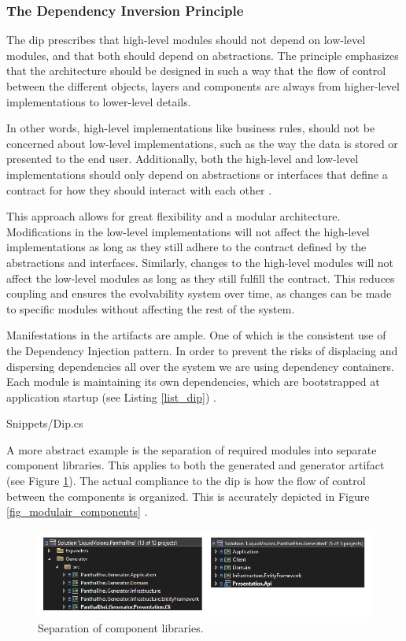 \subsubsection{The Dependency Inversion Principle} \label{subsubsec_dip} 

The \gls{dip} prescribes that high-level modules should not depend on low-level modules,
and that both should depend on abstractions. The principle emphasizes that the
architecture should be designed in such a way that the flow of control between the
different objects, layers and components are always from higher-level implementations
to lower-level details.

In other words, high-level implementations like business rules, should not be concerned
about low-level implementations, such as the way the data is stored or presented to the
end user. Additionally, both the high-level and low-level implementations should only
depend on abstractions or interfaces that define a contract for how they should interact
with each other \parencite[109]{robert_c_martin_clean_2018}.

This approach allows for great flexibility and a modular architecture. Modifications in
the low-level implementations will not affect the high-level implementations as long as
they still adhere to the contract defined by the abstractions and interfaces.
Similarly, changes to the high-level modules will not affect the low-level modules as long
as they still fulfill the contract. This reduces coupling and ensures the evolvability
system over time, as changes can be made to specific modules without affecting the rest of
the system.

Manifestations in the artifacts are ample. One of which is the consistent use of the
Dependency Injection pattern. In order to prevent the risks of displacing and dispersing
dependencies all over the system \parencite[214]{mannaert_normalized_2016} we are using
dependency containers. Each module is maintaining its own dependencies, which are
bootstrapped at application startup (see Listing \ref{list_dip})
\parencite{koks_generator_2023}.


    {Snippets/Dip.cs}

A more abstract example is the separation of required modules into separate component
libraries. This applies to both the generated and generator artifact (see Figure
\ref{fig_solutions}). The actual compliance to the \gls{dip} is how the flow of control
between the components is organized. This is accurately depicted in Figure
\ref{fig_modulair_components} .

\begin{figure}[H]
    \centering
    \includegraphics[width=1\textwidth]{figures/solutions.pdf}
    \caption[Separation of component libraries]{Separation of component libraries.}
    \label{fig_solutions}
\end{figure}